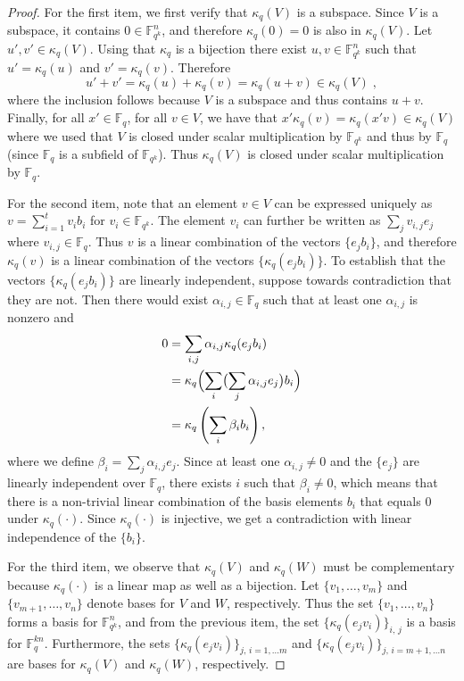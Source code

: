 \documentclass[11pt]{article}
\theoremstyle{definition}
\newcommand{\F}{\ensuremath{\mathbb{F}}}
\newcommand{\downsize}{\kappa}
\begin{document}
\begin{proof}
  For the first item, we first verify that $\downsize_q(V)$ is a subspace.
  Since $V$ is a subspace, it contains $0 \in \F_{q^k}^n$, and therefore $\downsize_q(0)
  = 0$ is also in $\downsize_q(V)$.
  Let $u', v' \in \downsize_q(V)$.
  Using that $\downsize_q$ is a bijection there exist $u,v \in \F_{q^k}^n$ such that
  $u' = \downsize_q(u)$ and $v' = \downsize_q(v)$. Therefore
  \[
    u' + v' = \downsize_q(u) + \downsize_q(v) =
    \downsize_q(u + v) \in \downsize_q(V)\;,
  \]
  where the inclusion follows because $V$ is a subspace and thus contains $u +
  v$.
  Finally, for all $x' \in \F_{q}$, for all $v \in V$, we have that $x'
  \downsize_q(v) = \downsize_q(x' v)\in \downsize_q(V)$ where we used that $V$
  is closed under scalar multiplication by $\F_{q^k}$ and thus by $\F_q$ (since
  $\F_q$ is a subfield of $\F_{q^k}$).
  Thus $\downsize_q(V)$ is closed under scalar multiplication by $\F_{q}$.

  For the second item, note that an element $v \in V$ can be expressed uniquely
  as $v = \sum_{i = 1}^t v_i b_i$ for $v_i \in \F_{q^k}$.
  The element $v_i$ can further be written as $\sum_j v_{i, j} e_j$ where $v_{i,
    j} \in \F_q$.
  Thus $v$ is a linear combination of the vectors $\{ e_j b_i \}$, and therefore
  $\downsize_q(v)$ is a linear combination of the vectors $\{ \downsize_q (e_j
  b_i) \}$.
  To establish that the vectors $\{ \downsize_q(e_j b_i) \}$ are linearly
  independent, suppose towards contradiction that they are not.
  Then there would exist $\alpha_{i, j} \in \F_q$ such that at least one
  $\alpha_{i, j}$ is nonzero and
  \begin{align*}
    0 & = \sum_{i,j} \alpha_{i, j} \downsize_q(e_j b_i) \\
      & = \downsize_q \Bigl( \sum_i \bigl (\sum_j \alpha_{i, j}
        e_j \bigr) b_i \Bigr) \\
      & = \downsize_q \left ( \sum_i \beta_i b_i \right ),
  \end{align*}
  where we define $\beta_i = \sum_j \alpha_{i, j} e_j$.
  Since at least one $\alpha_{i, j} \neq 0$ and the $\{e_j\}$ are linearly
  independent over $\F_q$, there exists $i$ such that $\beta_i \neq 0$, which
  means that there is a non-trivial linear combination of the basis elements
  $b_i$ that equals $0$ under $\downsize_q(\cdot)$.
  Since $\downsize_q(\cdot)$ is injective, we get a contradiction with linear
  independence of the $\{b_i\}$.

  For the third item, we observe that $\downsize_q(V)$ and $\downsize_q(W)$ must
  be complementary because $\downsize_q(\cdot)$ is a linear map as well as a
  bijection.
  Let $\{v_1,\ldots,v_m\}$ and $\{v_{m+1},\ldots,v_n\}$ denote bases for $V$ and
  $W$, respectively.
  Thus the set $\{v_1,\ldots,v_n\}$ forms a basis for $\F_{q^k}^n$, and from the
  previous item, the set $\{ \downsize_q(e_j v_i) \}_{i,\, j}$ is a basis for
  $\F_q^{kn}$.
  Furthermore, the sets $\{ \downsize_q(e_j v_i) \}_{j,\,i = 1,\ldots m}$ and
  $\{ \downsize_q(e_j v_i) \}_{j,\, i = m+1,\ldots n}$ are bases for
  $\downsize_q(V)$ and $\downsize_q(W)$, respectively.


\end{proof}
\end{document}
